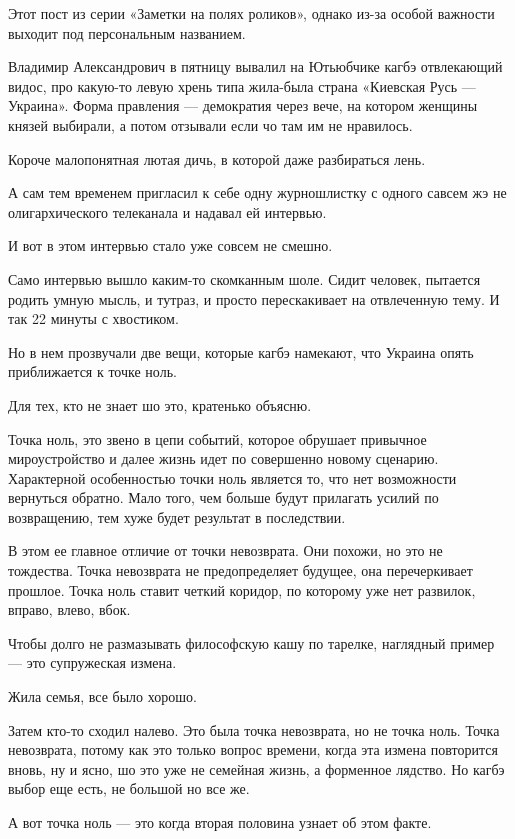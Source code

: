 \begin{multicols}{2} %
\setlength{\parindent}{0pt}

Этот пост из серии «Заметки на полях роликов», однако из-за особой важности
выходит под персональным названием.

Владимир Александрович в пятницу вывалил на Ютьюбчике кагбэ отвлекающий видос,
про какую-то левую хрень типа жила-была страна «Киевская Русь — Украина». Форма
правления — демократия через вече, на котором женщины князей выбирали, а потом
отзывали если чо там им не нравилось.

Короче малопонятная лютая дичь, в которой даже разбираться лень.

А сам тем временем пригласил к себе одну журношлистку с одного савсем жэ не
олигархического телеканала и надавал ей интервью.

И вот в этом интервью стало уже совсем не смешно.

Само интервью вышло каким-то скомканным шоле. Сидит человек, пытается родить
умную мысль, и тутраз, и просто перескакивает на отвлеченную тему. И так 22
минуты с хвостиком.

Но в нем прозвучали две вещи, которые кагбэ намекают, что Украина опять
приближается к точке ноль.

Для тех, кто не знает шо это, кратенько объясню.

Точка ноль, это звено в цепи событий, которое обрушает привычное мироустройство
и далее жизнь идет по совершенно новому сценарию. Характерной особенностью
точки ноль является то, что нет возможности вернуться обратно. Мало того, чем
больше будут прилагать усилий по возвращению, тем хуже будет результат в
последствии.

В этом ее главное отличие от точки невозврата. Они похожи, но это не тождества.
Точка невозврата не предопределяет будущее, она перечеркивает прошлое. Точка
ноль ставит четкий коридор, по которому уже нет развилок, вправо, влево, вбок.

Чтобы долго не размазывать философскую кашу по тарелке, наглядный пример — это
супружеская измена.

Жила семья, все было хорошо.

Затем кто-то сходил налево. Это была точка невозврата, но не точка ноль. Точка
невозврата, потому как это только вопрос времени, когда эта измена повторится
вновь, ну и ясно, шо это уже не семейная жизнь, а форменное лядство. Но кагбэ
выбор еще есть, не большой но все же.

А вот точка ноль — это когда вторая половина узнает об этом факте.


\end{multicols}
